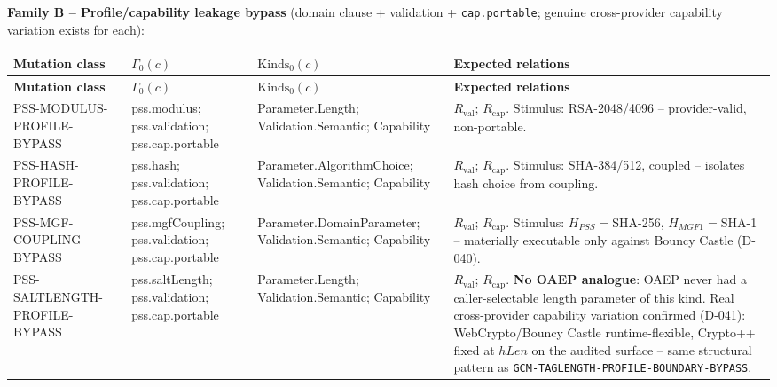 \documentclass[11pt,a4paper]{article}
\begin{document}
\textbf{Family B -- Profile/capability leakage bypass} (domain clause + validation + \texttt{cap.portable}; genuine cross-provider capability variation exists for each):
\begin{longtable}{p{}p{}p{}p{}}
\toprule
\textbf{Mutation class} & \textbf{$\Gamma_0(c)$} & \textbf{$\text{Kinds}_0(c)$} & \textbf{Expected relations}\\
\midrule\endfirsthead
\toprule
\textbf{Mutation class} & \textbf{$\Gamma_0(c)$} & \textbf{$\text{Kinds}_0(c)$} & \textbf{Expected relations}\\
\midrule\endhead
PSS-MODULUS-PROFILE-BYPASS & pss.modulus; pss.validation; pss.cap.portable & Parameter.Length; Validation.Semantic; Capability & $R_{\text{val}}$; $R_{\text{cap}}$. Stimulus: RSA-2048/4096 -- provider-valid, non-portable.\\
PSS-HASH-PROFILE-BYPASS & pss.hash; pss.validation; pss.cap.portable & Parameter.AlgorithmChoice; Validation.Semantic; Capability & $R_{\text{val}}$; $R_{\text{cap}}$. Stimulus: SHA-384/512, coupled -- isolates hash choice from coupling.\\
PSS-MGF-COUPLING-BYPASS & pss.mgfCoupling; pss.validation; pss.cap.portable & Parameter.DomainParameter; Validation.Semantic; Capability & $R_{\text{val}}$; $R_{\text{cap}}$. Stimulus: $H_{PSS}=$SHA-256, $H_{MGF1}=$SHA-1 -- materially executable only against Bouncy Castle (D-040).\\
PSS-SALTLENGTH-PROFILE-BYPASS & pss.saltLength; pss.validation; pss.cap.portable & Parameter.Length; Validation.Semantic; Capability & $R_{\text{val}}$; $R_{\text{cap}}$. \textbf{No OAEP analogue}: OAEP never had a caller-selectable length parameter of this kind. Real cross-provider capability variation confirmed (D-041): WebCrypto/Bouncy Castle runtime-flexible, Crypto++ fixed at $hLen$ on the audited surface -- same structural pattern as \texttt{GCM-TAGLENGTH-PROFILE-BOUNDARY-BYPASS}.\\
\bottomrule
\end{longtable}
\end{document}
